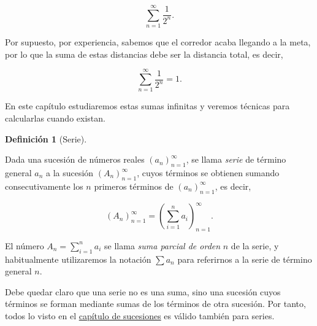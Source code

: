 \documentclass[
  a4paper,
]{scrreport}
\theoremstyle{plain}
\theoremstyle{plain}
\theoremstyle{definition}
\newtheorem{definition}{Definición}[chapter]
\theoremstyle{plain}
\theoremstyle{definition}
\theoremstyle{remark}
\begin{document}
\[
\sum_{n=1}^\infty \frac{1}{2^n}.
\]

Por supuesto, por experiencia, sabemos que el corredor acaba llegando a
la meta, por lo que la suma de estas distancias debe ser la distancia
total, es decir,

\[
\sum_{n=1}^\infty \frac{1}{2^n} = 1.
\]

En este capítulo estudiaremos estas sumas infinitas y veremos técnicas
para calcularlas cuando existan.

\leavevmode{}%
\begin{definition}[Serie]\label{def-serie}

Dada una sucesión de números reales \((a_n)_{n=1}^\infty\), se llama
\emph{serie} de término general \(a_n\) a la sucesión
\((A_n)_{n=1}^\infty\), cuyos términos se obtienen sumando
consecutivamente los \(n\) primeros términos de \((a_n)_{n=1}^\infty\),
es decir,

\[
(A_n)_{n=1}^\infty= \left(\sum_{i=1}^na_i\right)_{n=1}^\infty.
\]

El número \(A_n=\sum_{i=1}^n a_i\) se llama \emph{suma parcial de orden}
\(n\) de la serie, y habitualmente utilizaremos la notación \(\sum a_n\)
para referirnos a la serie de término general \(n\).

\end{definition}

\begin{tcolorbox}[enhanced jigsaw, title=\textcolor{quarto-callout-important-color}{\faExclamation}\hspace{0.5em}{Importante}, opacityback=0, titlerule=0mm, colback=white, opacitybacktitle=0.6, colbacktitle=quarto-callout-important-color!10!white, breakable, left=2mm, bottomtitle=1mm, toptitle=1mm, coltitle=black, arc=.35mm, leftrule=.75mm, toprule=.15mm, rightrule=.15mm, bottomrule=.15mm, colframe=quarto-callout-important-color-frame]

Debe quedar claro que una serie no es una suma, sino una sucesión cuyos
términos se forman mediante sumas de los términos de otra sucesión. Por
tanto, todos lo visto en el
\href{https://aprendeconalf.es/analisis-manual/sucesiones.html}{capítulo
de sucesiones} es válido también para series.

\end{tcolorbox}
\end{document}

